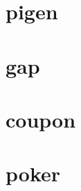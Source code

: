\documentclass{article}
\begin{document}
\tableofcontents
\section{pigen}

\section{gap}

\section{coupon}

\section{poker}

\end{document}
